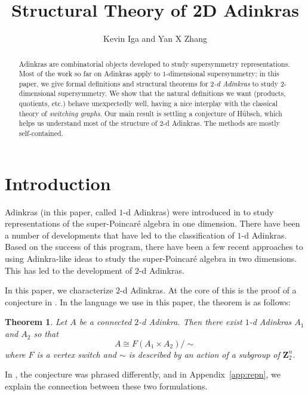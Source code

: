 \documentclass[12pt,twoside,singlespace]{article}
\title{Structural Theory of 2D Adinkras}
\author{Kevin Iga and Yan X Zhang}
\numberwithin{equation}{section}
\newtheorem{thm}[equation]{Theorem}
\theoremstyle{definition}
\newcommand{\ZZ}{\mathbf{Z}}
\begin{document}
\pagestyle{plain}

\maketitle

\begin{abstract}
Adinkras are combinatorial objects developed to study supersymmetry representations. Most of the work so far on Adinkras apply to $1$-dimensional supersymmetry; in this paper, we give formal definitions and structural theorems for \emph{$2$-d Adinkras} to study $2$-dimensional supersymmetry. We show that the natural definitions we want (products, quotients, etc.) behave unexpectedly well, having a nice interplay with the classical theory of \emph{switching graphs}. Our main result is settling a conjecture of H\"ubsch, which helps us understand most of the structure of $2$-d Adinkras. The methods are mostly self-contained.
\end{abstract}


\section{Introduction}
Adinkras (in this paper, called $1$-d Adinkras) were introduced in \cite{d2l:first} to study representations of the super-Poincar\'e algebra in one dimension.  There have been a number of developments that have led to the classification of $1$-d Adinkras.\cite{d2l:graph-theoretic,d2l:omni,d2l:topology,zhang:adinkras,dil:cohomology,d2l:decodes}  Based on the success of this program, there have been a few recent approaches to using Adinkra-like ideas to study the super-Poincar\'e algebra in two dimensions.  This has led to the development of $2$-d Adinkras.\cite{gates:dimensional_extension,hubsch:weaving}

In this paper, we characterize $2$-d Adinkras.  At the core of this is the proof of a conjecture in \cite{hubsch:weaving}.  In the language we use in this paper, the theorem is as follows:

\begin{thm}
\label{thm:main}
Let $A$ be a connected $2$-d Adinkra.  Then there exist $1$-d Adinkras $A_1$ and $A_2$ so that
\[A\cong F(A_1\times A_2)/\sim\]
where $F$ is a vertex switch and  $\sim$ is described by an action of a subgroup of $\ZZ_2^n$.
\end{thm}

In \cite{hubsch:weaving}, the conjecture was phrased differently, and in Appendix~\ref{app:repn}, we explain the connection between these two formulations.
\end{document}
